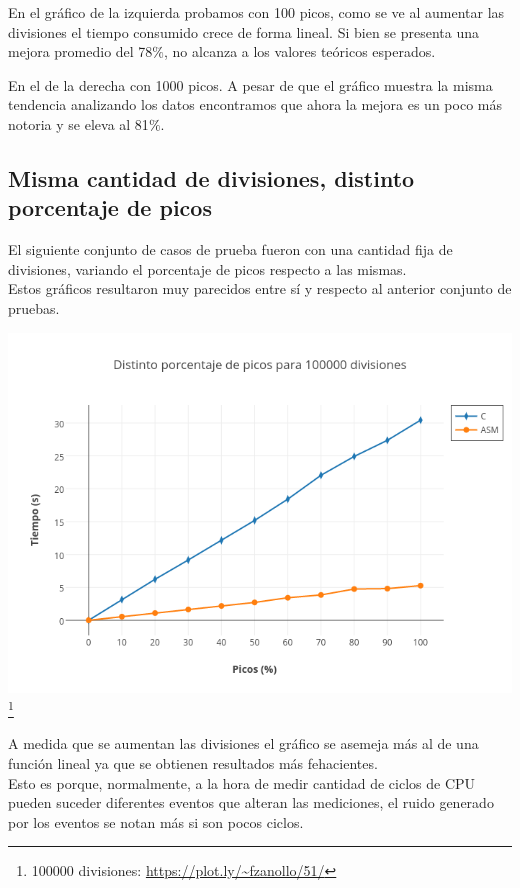 En el gráfico de la izquierda probamos con 100 picos, como se ve al aumentar las divisiones el tiempo consumido crece de forma lineal. Si bien se presenta una mejora promedio del 78$\%$, no alcanza a los valores teóricos esperados.

En el de la derecha con 1000 picos. A pesar de que el gráfico muestra la misma tendencia analizando los datos encontramos que ahora la mejora es un poco más notoria y se eleva al 81$\%$.

\newpage

\subsection{Misma cantidad de divisiones, distinto porcentaje de picos}

El siguiente conjunto de casos de prueba fueron con una cantidad fija de divisiones, variando el porcentaje de picos respecto a las mismas.\\

Estos gráficos resultaron muy parecidos entre sí y respecto al anterior conjunto de pruebas. 

\includegraphics[scale=0.6]{imagenes/distintosPicos100000divisiones.png}\footnote{ 100000 divisiones: \url{https://plot.ly/~fzanollo/51/}}  

A medida que se aumentan las divisiones el gráfico se asemeja más al de una función lineal ya que se obtienen resultados más fehacientes.\\

Esto es porque, normalmente, a la hora de medir cantidad de ciclos de CPU pueden suceder diferentes eventos que alteran las mediciones, el ruido generado por los eventos se notan más si son pocos ciclos.

